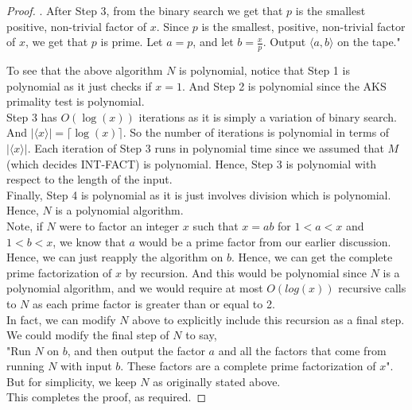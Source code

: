 \documentclass[12pt]{article}
\begin{document}
\begin{proof}
. After Step 3, from the binary search we get that $p$ is the smallest positive, non-trivial factor of $x$. Since $p$ is the smallest, positive, non-trivial factor of $x$, we get that $p$ is prime. Let $a = p$, and let $b = \frac{x}{p}$. Output $\langle a,b \rangle$ on the tape." \\
\setlength\parindent{0pt}

To see that the above algorithm $N$ is polynomial, notice that Step 1 is polynomial as it just checks if $x = 1$. And Step 2 is polynomial since the AKS primality test is polynomial. \\

Step 3 has $O(\log(x))$ iterations as it is simply a variation of binary search. And $|\langle x \rangle| = \lceil \log(x) \rceil$. So the number of iterations is polynomial in terms of $|\langle x \rangle|$. Each iteration of Step 3 runs in polynomial time since we assumed that $M$ (which decides INT-FACT) is polynomial. Hence, Step 3 is polynomial with respect to the length of the input. \\

Finally, Step 4 is polynomial as it is just involves division which is polynomial. \\

Hence, $N$ is a polynomial algorithm. \\

Note, if $N$ were to factor an integer $x$ such that $x = ab$ for $1 < a < x$ and $1 < b < x$, we know that $a$ would be a prime factor from our earlier discussion. Hence, we can just reapply the algorithm on $b$. Hence, we can get the complete prime factorization of $x$ by recursion. And this would be polynomial since $N$ is a polynomial algorithm, and we would require at most $O(log(x))$ recursive calls to $N$ as each prime factor is greater than or equal to 2. \\

In fact, we can modify $N$ above to explicitly include this recursion as a final step. We could modify the final step of $N$ to say, \\

"Run $N$ on $b$, and then output the factor $a$ and all the factors that come from running $N$ with input $b$. These factors are a complete prime factorization of $x$". \\

But for simplicity, we keep $N$ as originally stated above. \\

This completes the proof, as required. 
\end{proof}
\end{document}

